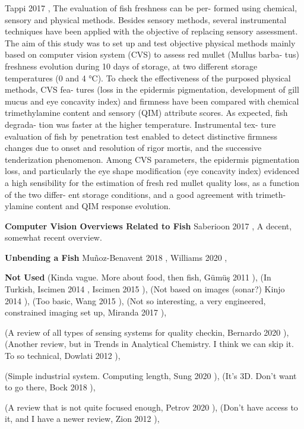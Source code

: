 Tappi 2017 \cite{Tappi2017ComputerVS},
The evaluation of fish freshness can be per- formed using chemical, sensory and physical methods. Besides sensory methods, several instrumental techniques have been applied with the objective of replacing sensory assessment. The aim of this study was to set up and test objective physical methods mainly based on computer vision system (CVS) to assess red mullet (Mullus barba- tus) freshness evolution during 10 days of storage, at two different storage temperatures (0 and 4 °C). To check the effectiveness of the purposed physical methods, CVS fea- tures (loss in the epidermis pigmentation, development of gill mucus and eye concavity index) and firmness have been compared with chemical trimethylamine content and sensory (QIM) attribute scores. As expected, fish degrada- tion was faster at the higher temperature. Instrumental tex- ture evaluation of fish by penetration test enabled to detect distinctive firmness changes due to onset and resolution of rigor mortis, and the successive tenderization phenomenon. Among CVS parameters, the epidermis pigmentation loss, and particularly the eye shape modification (eye concavity index) evidenced a high sensibility for the estimation of fresh red mullet quality loss, as a function of the two differ- ent storage conditions, and a good agreement with trimeth- ylamine content and QIM response evolution.

\textbf{Computer Vision Overviews Related to Fish}\newline
Saberioon 2017 \cite{Saberioon2017ApplicationOM}, A decent, somewhat 
recent overview.


\textbf{Unbending a Fish}\newline
Mu{\~n}oz-Benavent 2018 \cite{MuozBenavent2018EnhancedFB},
Williams 2020 \cite{Williams:2020:UIF},

\textbf{Not Used}\newline
(Kinda vague. More about food, then fish, G{\"u}m{\"u}ş 2011 \cite{Gm2011MachineVA}),
(In Turkish, Iscimen 2014 \cite{Iscimen2014ImageAM},
Iscimen 2015 \cite{Iscimen2015ClassificationOF}),
(Not based on images (sonar?) Kinjo 2014 \cite{KinjoAtsushi2014Scoi}),
(Too basic, Wang 2015 \cite{Huihui2015StudyOT}),
(Not so interesting, a very engineered, constrained imaging set up, Miranda 2017 \cite{MIRANDA201741}),

(A review of all types of sensing systems for quality checkin, Bernardo 2020 \cite{Bernardo2020FishQI}),
(Another review, but in Trends in Analytical Chemistry. I think we can
skip it. To so technical, Dowlati 2012 \cite{Dowlati2012ApplicationOM}),

(Simple industrial system. Computing length, Sung 2020 \cite{Sung2020AutomaticGF}),
(It's 3D. Don't want to go there, Bock 2018 \cite{BockAlexander2018TITE}),

(A review that is not quite focused enough, Petrov 2020 \cite{Petrov2020Overview}),
(Don't have access to it, and I have a newer review, Zion 2012 \cite{Zion2012ReviewTU}),


